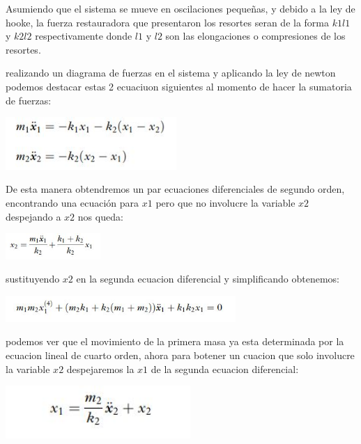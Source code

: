 \documentclass{article}
\begin{document}
Asumiendo que el sistema se mueve en oscilaciones pequeñas, y debido a la ley de hooke, la fuerza restauradora que presentaron los resortes seran de la forma $k1l1$ y $k2l2$ respectivamente donde $l1$ y $l2$ son las elongaciones o compresiones de los resortes.

realizando un diagrama de fuerzas en el sistema y aplicando la ley de newton podemos destacar estas 2 ecuaciuon siguientes al momento de hacer la sumatoria de fuerzas:

\begin{center}
\includegraphics[height=2cm]{ec1.png}
\end{center}

De esta manera obtendremos un par ecuaciones diferenciales de segundo orden, encontrando una ecuación para $x1$ pero que no involucre la variable $x2$ despejando a $x2$ nos queda:

\begin{center}
\includegraphics[height=1cm]{ec2.png}
\end{center}

sustituyendo $x2$ en la segunda ecuacion diferencial y simplificando obtenemos:

\begin{center}
\includegraphics[height=1cm]{ec3.png}
\end{center}

podemos ver que el movimiento de la primera masa ya esta determinada por la ecuacion lineal de cuarto orden, ahora para botener un cuacion que solo involucre la variable $x2$
despejaremos la $x1$ de la segunda ecuacion diferencial:

\begin{center}
\includegraphics[height=2cm]{ec4.png}
\end{center}
\end{document}
